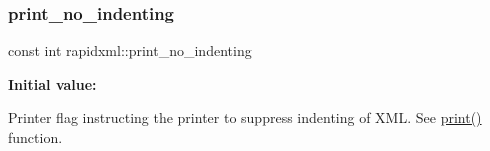 \subsubsection{\texorpdfstring{print\_no\_indenting}{print\_no\_indenting}}
{\footnotesize\ttfamily const int rapidxml\+::print\+\_\+no\+\_\+indenting}

{\bfseries Initial value\+:}
\begin{DoxyCode}{0}
\DoxyCodeLine{=}

\end{DoxyCode}
Printer flag instructing the printer to suppress indenting of X\+ML. See \mbox{\hyperlink{namespacerapidxml_a0fb0be6eba49fb2e2646d5a72a0dc355}{print()}} function. 